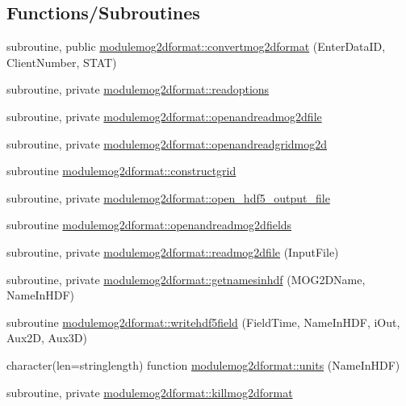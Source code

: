 \subsection*{Functions/\+Subroutines}
\begin{DoxyCompactItemize}
\item 
subroutine, public \mbox{\hyperlink{namespacemodulemog2dformat_a734bfcb7f534ab9c91af8672cea24021}{modulemog2dformat\+::convertmog2dformat}} (Enter\+Data\+ID, Client\+Number, S\+T\+AT)
\item 
subroutine, private \mbox{\hyperlink{namespacemodulemog2dformat_a205a84f8a26a7043d7b186a44a8a530a}{modulemog2dformat\+::readoptions}}
\item 
subroutine, private \mbox{\hyperlink{namespacemodulemog2dformat_a9fd3a03a7c7ed9e05602123a50dc5726}{modulemog2dformat\+::openandreadmog2dfile}}
\item 
subroutine, private \mbox{\hyperlink{namespacemodulemog2dformat_aae3ca34111cfb5aa29845bcbac420694}{modulemog2dformat\+::openandreadgridmog2d}}
\item 
subroutine \mbox{\hyperlink{namespacemodulemog2dformat_aec84c860ca2bbc962dda260595025f58}{modulemog2dformat\+::constructgrid}}
\item 
subroutine, private \mbox{\hyperlink{namespacemodulemog2dformat_af04a77a337b8d48c2fd163ae89586914}{modulemog2dformat\+::open\+\_\+hdf5\+\_\+output\+\_\+file}}
\item 
subroutine \mbox{\hyperlink{namespacemodulemog2dformat_a49362eefaf162d386ec42c4957e72b1a}{modulemog2dformat\+::openandreadmog2dfields}}
\item 
subroutine, private \mbox{\hyperlink{namespacemodulemog2dformat_a49448dbf7a75da20faf8c9e64364c199}{modulemog2dformat\+::readmog2dfile}} (Input\+File)
\item 
subroutine, private \mbox{\hyperlink{namespacemodulemog2dformat_af9424852561b70ff9a6dd1f247d73c37}{modulemog2dformat\+::getnamesinhdf}} (M\+O\+G2\+D\+Name, Name\+In\+H\+DF)
\item 
subroutine \mbox{\hyperlink{namespacemodulemog2dformat_acbf2158af081eb0e8e9996387d7dfd5f}{modulemog2dformat\+::writehdf5field}} (Field\+Time, Name\+In\+H\+DF, i\+Out, Aux2D, Aux3D)
\item 
character(len=stringlength) function \mbox{\hyperlink{namespacemodulemog2dformat_aa554861ca3342b570e56692003d31785}{modulemog2dformat\+::units}} (Name\+In\+H\+DF)
\item 
subroutine, private \mbox{\hyperlink{namespacemodulemog2dformat_ad23545e02e1d7e1b08d7f23fc6220308}{modulemog2dformat\+::killmog2dformat}}
\end{DoxyCompactItemize}
